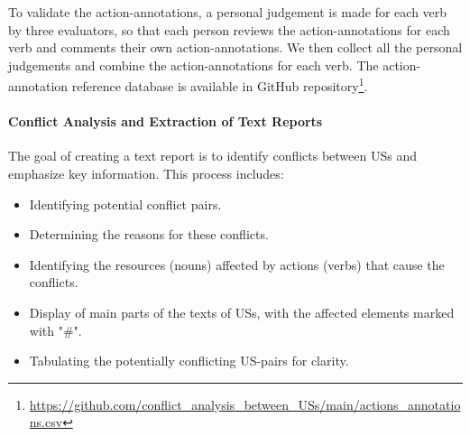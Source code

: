 To validate the action-annotations, a personal judgement is made for each verb by three evaluators, so that each person reviews the action-annotations for each verb and comments their own action-annotations. We then collect all the personal judgements and combine the action-annotations for each verb. The action-annotation reference database is available in GitHub repository\footnote{\href{https://github.com/amirrabieyannejad/conflict_analysis_between_USs/blob/main/actions_annotations.csv}{https://github.com/conflict\_analysis\_between\_USs/main/actions\_annotations.csv}}.


\paragraph{Conflict Analysis and Extraction of Text Reports} The goal of creating a text report is to identify conflicts between USs and emphasize key information. This process includes:
\begin{itemize}
\item Identifying potential conflict pairs.

\item Determining the reasons for these conflicts.

\item Identifying the resources (nouns) affected by actions (verbs) that cause the conflicts.

\item Display of main parts of the texts of USs, with the affected elements marked with "\#".

\item Tabulating the potentially conflicting US-pairs for clarity.
\end{itemize}
